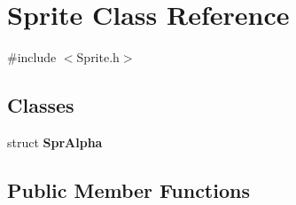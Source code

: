 \hypertarget{classSprite}{
\section{Sprite Class Reference}
\label{classSprite}
}


{\ttfamily \#include $<$Sprite.h$>$}\subsection*{Classes}
\begin{DoxyCompactItemize}
\item 
struct {\bfseries SprAlpha}
\end{DoxyCompactItemize}
\subsection*{Public Member Functions}
